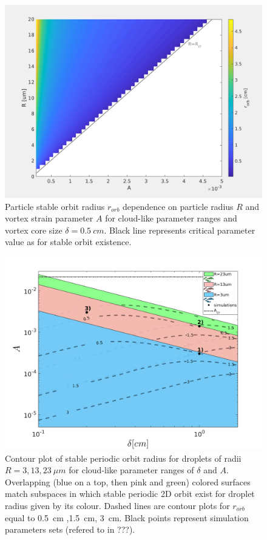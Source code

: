 \documentclass[../main.tex]{subfiles}
\begin{document}
\begin{figure}
\centering
\noindent \includegraphics[width=30pc]{gfx/orbit_vs_R_A_delta05cm.png}
\caption{Particle stable orbit radius $r_{orb}$ dependence on  particle radius $R$ and vortex strain parameter $A$ for cloud-like parameter ranges and vortex core size $\delta=0.5~cm$. Black line represents critical parameter value as for stable orbit existence.}
\label{fig:ch3_3a}
\end{figure}


\begin{figure}
\centering
\noindent \includegraphics[width=30pc]{gfx/fig05.png}
\caption{Contour plot of stable periodic orbit radius for droplets of radii $R=3,13,23 \ \mu m$ for cloud-like parameter ranges of $\delta$ and $A$. Overlapping (blue on a top, then pink and green) colored surfaces match subspaces in which stable periodic 2D orbit exist for droplet radius given by its colour. Dashed lines are contour plots for $r_{orb}$ equal to 0.5~cm ,1.5~cm, 3~cm. Black points represent simulation parameters sets (refered to in ???).}
\label{fig:ch3_30}
\end{figure}
\end{document}
